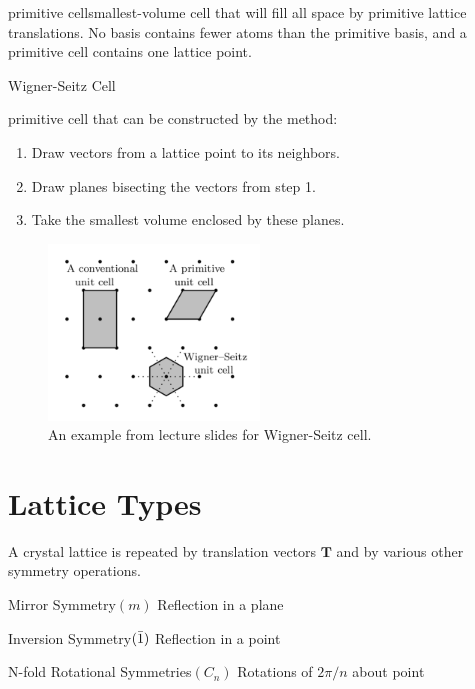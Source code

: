 \begin{definition}
{primitive cell}{smallest-volume cell that will fill all space by primitive lattice translations. No basis contains fewer atoms than the primitive basis, and a primitive cell contains one lattice point.}
\end{definition}

\begin{definition}
{Wigner-Seitz Cell}
{primitive cell that can be constructed by the method:
\begin{enumerate}
    \item Draw vectors from a lattice point to its neighbors.
    \item Draw planes bisecting the vectors from step 1.
    \item Take the smallest volume enclosed by these planes.
\end{enumerate}
}
\end{definition}

\begin{figure}[h]
    \centering
    \includegraphics[width=0.5\textwidth]{./figures/wigner-seitz-ex.png}
    \caption{An example from lecture slides for Wigner-Seitz cell.}
    \label{fig:wigner-seitz-ex}
\end{figure}



\section{Lattice Types}
A crystal lattice is repeated by translation vectors $\mathbf{T}$ and by various other symmetry operations. 
\begin{definition}
{Mirror Symmetry}{$(m)$ Reflection in a plane}
\end{definition}
\begin{definition}
{Inversion Symmetry}{$(\Bar{1})$ Reflection in a point}
\end{definition}
\begin{definition}
{N-fold Rotational Symmetries}{$(C_n)$ Rotations of $2\pi/n$ about point}
\end{definition}

